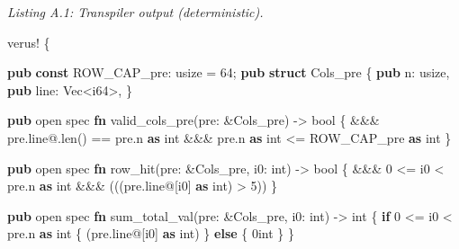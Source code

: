 \documentclass[
  10pt,
]{article}
\newenvironment{Shaded}{}{}
\newcommand{\ControlFlowTok}[1]{\textcolor[rgb]{0.00,0.44,0.13}{\textbf{#1}}}
\newcommand{\DataTypeTok}[1]{\textcolor[rgb]{0.56,0.13,0.00}{#1}}
\newcommand{\DecValTok}[1]{\textcolor[rgb]{0.25,0.63,0.44}{#1}}
\newcommand{\KeywordTok}[1]{\textcolor[rgb]{0.00,0.44,0.13}{\textbf{#1}}}
\newcommand{\NormalTok}[1]{#1}
\newcommand{\OperatorTok}[1]{\textcolor[rgb]{0.40,0.40,0.40}{#1}}
\newcommand{\PreprocessorTok}[1]{\textcolor[rgb]{0.74,0.48,0.00}{#1}}
\begin{document}
\emph{Listing A.1: Transpiler output (deterministic).}

\begin{Shaded}
\begin{Highlighting}[]
\PreprocessorTok{verus!} \OperatorTok{\{}

\KeywordTok{pub} \KeywordTok{const}\NormalTok{ ROW\_CAP\_pre}\OperatorTok{:} \DataTypeTok{usize} \OperatorTok{=} \DecValTok{64}\OperatorTok{;}
\KeywordTok{pub} \KeywordTok{struct}\NormalTok{ Cols\_pre }\OperatorTok{\{}
    \KeywordTok{pub}\NormalTok{ n}\OperatorTok{:} \DataTypeTok{usize}\OperatorTok{,}
    \KeywordTok{pub}\NormalTok{ line}\OperatorTok{:} \DataTypeTok{Vec}\OperatorTok{\textless{}}\DataTypeTok{i64}\OperatorTok{\textgreater{},}
\OperatorTok{\}}

\KeywordTok{pub}\NormalTok{ open spec }\KeywordTok{fn}\NormalTok{ valid\_cols\_pre(pre}\OperatorTok{:} \OperatorTok{\&}\NormalTok{Cols\_pre) }\OperatorTok{{-}\textgreater{}} \DataTypeTok{bool} \OperatorTok{\{}
    \OperatorTok{\&\&\&}\NormalTok{ pre}\OperatorTok{.}\NormalTok{line}\OperatorTok{@.}\NormalTok{len() }\OperatorTok{==}\NormalTok{ pre}\OperatorTok{.}\NormalTok{n }\KeywordTok{as}\NormalTok{ int}
    \OperatorTok{\&\&\&}\NormalTok{ pre}\OperatorTok{.}\NormalTok{n }\KeywordTok{as}\NormalTok{ int }\OperatorTok{\textless{}=}\NormalTok{ ROW\_CAP\_pre }\KeywordTok{as}\NormalTok{ int}
\OperatorTok{\}}

\KeywordTok{pub}\NormalTok{ open spec }\KeywordTok{fn}\NormalTok{ row\_hit(pre}\OperatorTok{:} \OperatorTok{\&}\NormalTok{Cols\_pre}\OperatorTok{,}\NormalTok{ i0}\OperatorTok{:}\NormalTok{ int) }\OperatorTok{{-}\textgreater{}} \DataTypeTok{bool} \OperatorTok{\{}
    \OperatorTok{\&\&\&} \DecValTok{0} \OperatorTok{\textless{}=}\NormalTok{ i0 }\OperatorTok{\textless{}}\NormalTok{ pre}\OperatorTok{.}\NormalTok{n }\KeywordTok{as}\NormalTok{ int}
    \OperatorTok{\&\&\&}\NormalTok{ (((pre}\OperatorTok{.}\NormalTok{line}\OperatorTok{@}\NormalTok{[i0] }\KeywordTok{as}\NormalTok{ int) }\OperatorTok{\textgreater{}} \DecValTok{5}\NormalTok{))}
\OperatorTok{\}}

\KeywordTok{pub}\NormalTok{ open spec }\KeywordTok{fn}\NormalTok{ sum\_total\_val(pre}\OperatorTok{:} \OperatorTok{\&}\NormalTok{Cols\_pre}\OperatorTok{,}\NormalTok{ i0}\OperatorTok{:}\NormalTok{ int) }\OperatorTok{{-}\textgreater{}}\NormalTok{ int }\OperatorTok{\{}
    \ControlFlowTok{if} \DecValTok{0} \OperatorTok{\textless{}=}\NormalTok{ i0 }\OperatorTok{\textless{}}\NormalTok{ pre}\OperatorTok{.}\NormalTok{n }\KeywordTok{as}\NormalTok{ int }\OperatorTok{\{}
\NormalTok{        (pre}\OperatorTok{.}\NormalTok{line}\OperatorTok{@}\NormalTok{[i0] }\KeywordTok{as}\NormalTok{ int)}
    \OperatorTok{\}} \ControlFlowTok{else} \OperatorTok{\{}
\NormalTok{        0int}
    \OperatorTok{\}}
\OperatorTok{\}}


\end{Highlighting}
\end{Shaded}
\end{document}
